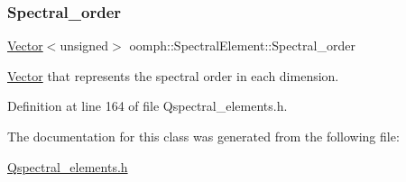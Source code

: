 \mbox{\label{classoomph_1_1SpectralElement_ae9c3930a2471ee0298dcd088380c8d03}} 
\subsubsection{\texorpdfstring{Spectral\+\_\+order}{Spectral\_order}}
{\footnotesize\ttfamily \hyperlink{classoomph_1_1Vector}{Vector}$<$unsigned$>$ oomph\+::\+Spectral\+Element\+::\+Spectral\+\_\+order\hspace{0.3cm}{\ttfamily [protected]}}



\hyperlink{classoomph_1_1Vector}{Vector} that represents the spectral order in each dimension. 



Definition at line 164 of file Qspectral\+\_\+elements.\+h.



The documentation for this class was generated from the following file\+:\begin{DoxyCompactItemize}
\item 
\hyperlink{Qspectral__elements_8h}{Qspectral\+\_\+elements.\+h}\end{DoxyCompactItemize}
